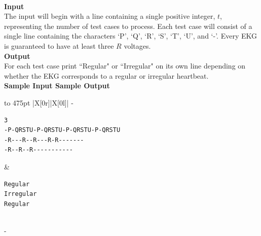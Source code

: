 \documentclass[a4paper,11pt]{article}
\begin{document}
\vspace{7mm}\\
\large{\bf{Input}}\vspace{2mm}\\
The input will begin with a line containing a single positive integer, $t$, representing the number of test cases to process. Each test case will consist of a single line containing the characters `P', `Q', `R', `S', `T', `U', and `-'. Every EKG is guaranteed to have at least three $R$ voltages.
\vspace{20mm}\\
\large{\bf{Output}}\vspace{2mm}\\
For each test case print ``Regular" or ``Irregular" on its own line depending on whether the EKG corresponds to a regular or irregular heartbeat.
\vspace{5mm}\\
\bf{Sample Input} \hspace{52mm} \bf{Sample Output}\vspace{1mm}\\
\begin{tabu*} to 475pt {|X[0r]|X[0l]|}
\tabucline-
\vspace{-\baselineskip} %
\begin{Verbatim}
3
-P-QRSTU-P-QRSTU-P-QRSTU-P-QRSTU
-R---R--R---R-R-------
-R--R--R-----------
\end{Verbatim}
&
\vspace{-\baselineskip} %
\begin{Verbatim}
Regular
Irregular
Regular
\end{Verbatim}
\\
\tabucline-
\end{tabu*}
\end{document}
